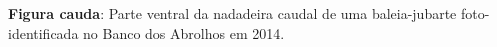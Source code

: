 \textbf{Figura cauda}: Parte ventral da nadadeira caudal de uma baleia-jubarte foto-identificada  no Banco dos Abrolhos em 2014.